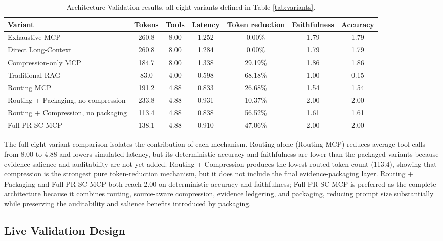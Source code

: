 \begin{table}[!t]
  \caption{Architecture Validation results, all eight variants defined in Table \ref{tab:variants}.}
  \label{tab:archval}
  \begin{tabular}{lcccccc}
    \toprule
    \textbf{Variant} & \textbf{Tokens} & \textbf{Tools} & \textbf{Latency} & \textbf{Token reduction} & \textbf{Faithfulness} & \textbf{Accuracy} \\
    \midrule
    Exhaustive MCP & 260.8 & 8.00 & 1.252 & 0.00\% & 1.79 & 1.79 \\
    Direct Long-Context & 260.8 & 8.00 & 1.284 & 0.00\% & 1.79 & 1.79 \\
    Compression-only MCP & 184.7 & 8.00 & 1.338 & 29.19\% & 1.86 & 1.86 \\
    Traditional RAG & 83.0 & 4.00 & 0.598 & 68.18\% & 1.00 & 0.15 \\
    Routing MCP & 191.2 & 4.88 & 0.833 & 26.68\% & 1.54 & 1.54 \\
    Routing + Packaging, no compression & 233.8 & 4.88 & 0.931 & 10.37\% & 2.00 & 2.00 \\
    Routing + Compression, no packaging & 113.4 & 4.88 & 0.838 & 56.52\% & 1.61 & 1.61 \\
    Full PR-SC MCP & 138.1 & 4.88 & 0.910 & 47.06\% & 2.00 & 2.00 \\
    \bottomrule
  \end{tabular}
\end{table}

The full eight-variant comparison isolates the contribution of each mechanism. Routing alone (Routing MCP) reduces average tool calls from 8.00 to 4.88 and lowers simulated latency, but its deterministic accuracy and faithfulness are lower than the packaged variants because evidence salience and auditability are not yet added. Routing + Compression produces the lowest routed token count (113.4), showing that compression is the strongest pure token-reduction mechanism, but it does not include the final evidence-packaging layer. Routing + Packaging and Full PR-SC MCP both reach 2.00 on deterministic accuracy and faithfulness; Full PR-SC MCP is preferred as the complete architecture because it combines routing, source-aware compression, evidence ledgering, and packaging, reducing prompt size substantially while preserving the auditability and salience benefits introduced by packaging.

\subsection{Live Validation Design}

